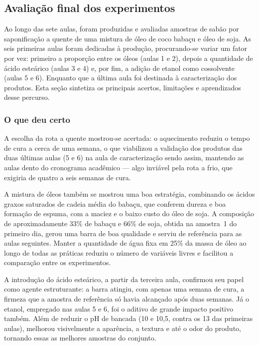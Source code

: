 \subsection{Avaliação final dos experimentos}

Ao longo das sete aulas, foram produzidas e avaliadas amostras de sabão por saponificação a quente de uma mistura de óleo de coco babaçu e óleo de soja. As seis primeiras aulas foram dedicadas à produção, procurando-se variar um fator por vez: primeiro a proporção entre os óleos (aulas 1 e 2), depois a quantidade de ácido esteárico (aulas 3 e 4) e, por fim, a adição de etanol como cossolvente (aulas 5 e 6). Enquanto que a última aula foi destinada à caracterização dos produtos. Esta seção sintetiza os principais acertos, limitações e aprendizados desse percurso.

\subsubsection{O que deu certo}

A escolha da rota a quente mostrou-se acertada: o aquecimento reduziu o tempo de cura a cerca de uma semana, o que viabilizou a validação dos produtos das duas últimas aulas (5 e 6) na aula de caracterização sendo assim, mantendo as aulas dento do cronograma acadêmico — algo inviável pela rota a frio, que exigiria de quatro a seis semanas de cura.

A mistura de óleos também se mostrou uma boa estratégia, combinando os ácidos graxos saturados de cadeia média do babaçu, que conferem dureza e boa formação de espuma, com a maciez e o baixo custo do óleo de soja. A composição de aproximadamente 33\% de babaçu e 66\% de soja, obtida na amostra~1 do primeiro dia, gerou uma barra de boa qualidade e serviu de referência para as aulas seguintes. Manter a quantidade de água fixa em 25\% da massa de óleo ao longo de todas as práticas reduziu o número de variáveis livres e facilitou a comparação entre os experimentos.

A introdução do ácido esteárico, a partir da terceira aula, confirmou seu papel como agente estruturante: a barra atingiu, com apenas uma semana de cura, a firmeza que a amostra de referência só havia alcançado após duas semanas. Já o etanol, empregado nas aulas 5 e 6, foi o aditivo de grande impacto positivo também. Além de reduzir o pH de bancada (10 e 10,5, contra os 13 das primeiras aulas), melhorou visivelmente a aparência, a textura e até o odor do produto, tornando essas as melhores amostras do conjunto.

